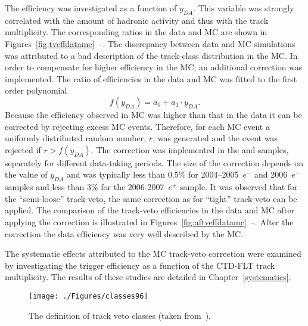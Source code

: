 The efficiency was investigated as a function of $y_{DA}$. This variable was strongly correlated with the amount of hadronic activity and thus with the track multiplicity. The corresponding ratios in the data and MC are shown in Figures~\ref{fig:tveffdatamc}~--. The discrepancy between data and MC simulations was attributed to a bad description of the track-class distribution in the MC. In order to compensate for higher efficiency in the MC, an additional correction was implemented. The ratio of efficiencies in the data and MC was fitted to the first order polynomial
\begin{equation} 
 f\left(y_{DA}\right)=a_0 + a_1 \cdot y_{DA}.
\end{equation}
Because the efficiency observed in MC was higher than that in the data it can be corrected by rejecting excess MC events. Therefore, for each MC event a uniformly distributed random number, $r$, was generated and the event was rejected if $r > f\left(y_{DA}\right)$. The correction was implemented in the \lepto and \ariadne samples, separately for different data-taking periods. The size of the correction depends on the value of $y_{DA}$ and was typically less than 0.5\% for 2004--2005~$e^-$ and 2006~$e^-$ samples and less than 3\% for the 2006-2007~$e^+$ sample. It was observed that for the ``semi-loose'' track-veto, the same correction as for ``tight'' track-veto can be applied. The comparison of the track-veto efficiencies in the data and MC after applying the correction is illustrated in Figures~\ref{fig:aftveffdatamc}~--. After the correction the data efficiency was very well described by the MC. 

The systematic effects attributed to the MC track-veto correction were examined by investigating the trigger efficiency as a function of the CTD-FLT track multiplicity. The results of these studies are detailed in Chapter~\ref{systematics}.
\begin{figure}[t]
  \begin{center}
    \texttt{[image: ./Figures/classes96]}
  \end{center}
  \caption{The definition of track veto classes (taken from~\protect\cite{YamazakiSite}).}
  \label{fig:trackvetodefinition}
\end{figure}

